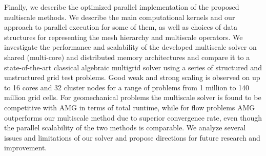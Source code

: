 Finally, we describe the optimized parallel implementation of the proposed multiscale methods.   We describe the main computational kernels and our approach to parallel execution for some of them, as well as choices of data structures for representing the mesh hierarchy and multiscale operators.   We investigate the performance and scalability of the developed multiscale solver on shared (multi-core) and distributed memory architectures and compare it to a state-of-the-art classical algebraic multigrid solver using a series of structured and unstructured grid test problems.   Good weak and strong scaling is observed on up to 16 cores and 32 cluster nodes for a range of problems from 1 million to 140 million grid cells.   For geomechanical problems the multiscale solver is found to be competitive with AMG in terms of total runtime, while for flow problems AMG outperforms our multiscale method due to superior convergence rate, even though the parallel scalability of the two methods is comparable.   We analyze several issues and limitations of our solver and propose directions for future research and improvement.